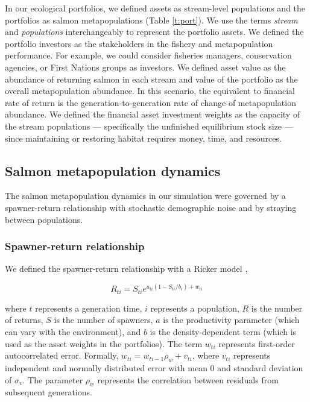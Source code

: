 In our ecological portfolios, we defined assets as stream-level
populations and the portfolios as salmon metapopulations (Table
\ref{t:port}). We use the terms \textit{stream} and \textit{populations}
interchangeably to represent the portfolio assets. We defined the
portfolio investors as the stakeholders in the fishery and
metapopulation performance. For example, we could consider fisheries
managers, conservation agencies, or First Nations groups as investors.
We defined asset value as the abundance of returning salmon in each
stream and value of the portfolio as the overall metapopulation
abundance. In this scenario, the equivalent to financial rate of return
is the generation-to-generation rate of change of metapopulation
abundance. We defined the financial asset investment weights as the
capacity of the stream populations --- specifically the unfinished
equilibrium stock size --- since maintaining or restoring habitat
requires money, time, and resources.

\subsection{Salmon metapopulation dynamics}

The salmon metapopulation dynamics in our simulation were governed by a
spawner-return relationship with stochastic demographic noise and by
straying between populations.

\subsubsection{Spawner-return relationship}

We defined the spawner-return relationship with a Ricker model
\citep{ricker1954},

\begin{equation}
R_{ti} = S_{ti}e^{a_{ti}(1-S_{ti}/b_i) + w_{ti}}
\end{equation}

\noindent where $t$ represents a generation time, $i$ represents a
population, $R$ is the number of returns, $S$ is the number of spawners,
$a$ is the productivity parameter (which can vary with the environment),
and $b$ is the density-dependent term (which is used as the asset
weights in the portfolios). The term $w_{ti}$ represents first-order
autocorrelated error. Formally, $w_{ti} = w_{ti-1} \rho_w + v_{ti}$,
where $v_{ti}$ represents independent and normally distributed error
with mean 0 and standard deviation of $\sigma_v$. The parameter $\rho_w$
represents the correlation between residuals from subsequent
generations.

